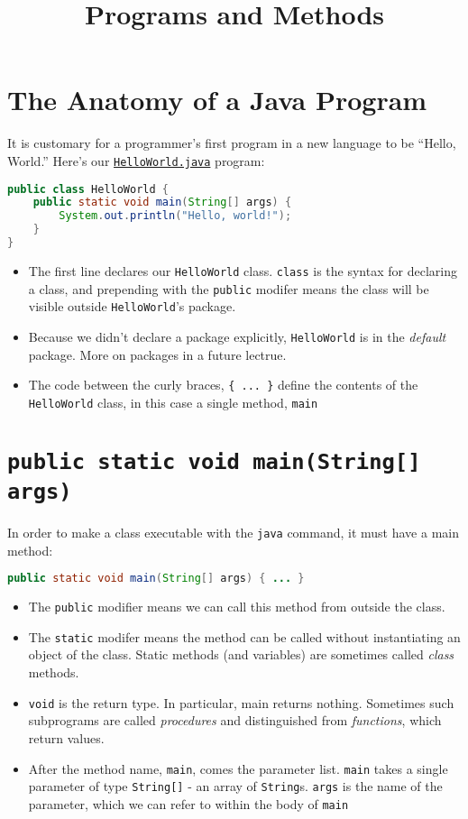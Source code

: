 \documentclass{article}
\title{Programs and Methods}
\date{}
\begin{document}
\maketitle

\section{The Anatomy of a Java Program}


It is customary for a programmer's first program in a new language to be ``Hello, World.''  Here's our \href{\code/basics/HelloWorld.java}{{\tt HelloWorld.java}} program:
\begin{lstlisting}[language=Java]
public class HelloWorld {
    public static void main(String[] args) {
        System.out.println("Hello, world!");
    }
}
\end{lstlisting}

\begin{itemize}
\item The first line declares our {\tt HelloWorld} class.  {\tt class} is the syntax for declaring a class, and prepending with the {\tt public} modifer means the class will be visible outside {\tt HelloWorld}'s package.
\item Because we didn't declare a package explicitly, {\tt HelloWorld} is in the {\it default} package.  More on packages in a future lectrue.
\item The code between the curly braces, {\tt \{ ... \}} define the contents of the {\tt HelloWorld} class, in this case a single method, {\tt main}
\end{itemize}


\section{{\tt public static void main(String[] args)}}


In order to make a class executable with the {\tt java} command, it must have a main method:
\begin{lstlisting}[language=Java]
public static void main(String[] args) { ... }
\end{lstlisting}

\begin{itemize}
\item The {\tt public} modifier means we can call this method from outside the class.
\item The {\tt static} modifer means the method can be called without instantiating an object of the class.  Static methods (and variables) are sometimes called {\it class} methods.
\item {\tt void} is the return type.  In particular, main returns nothing.  Sometimes such subprograms are called {\it procedures} and distinguished from {\it functions}, which return values.
\item After the method name, {\tt main}, comes the parameter list.  {\tt main} takes a single parameter of type {\tt String[]} - an array of {\tt String}s.  {\tt args} is the name of the parameter, which we can refer to within the body of {\tt main}
\end{itemize}
\end{document}
